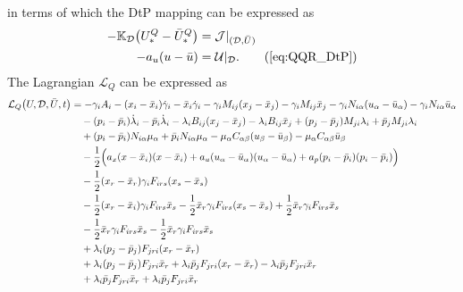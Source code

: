 \documentclass[11pt]{article}
\newcommand{\K}{\mathbb{K}}
\newcommand{\half}{\frac{1}{2}}
\newcommand{\calU}{{\cal U}}
\newcommand{\dee}{\mathcal{D}}
\newcommand{\scl}{\mathcal{L}}
\begin{document}
in terms of which the DtP mapping can be expressed as
\begin{subequations}\label{eq:QQR_DtP}
    \allowdisplaybreaks
    \begin{align}
        - \K_\dee \big(U^Q_* - \bar{U}^Q_*\big) & = \mathcal{J}|_{(\dee,\bar{U})} \notag\\
        - a_u (u - \bar{u}) & = \calU |_\dee. \tag{\ref{eq:QQR_DtP}}
    \end{align}
\end{subequations}
The Lagrangian $\scl_Q$ can be expressed as
\begin{subequations}\label{eq:mixed_QQR_L}
\allowdisplaybreaks
\begin{align}
    \scl_Q \big( U,\dee,\bar{U},t\big) & = - \gamma_i A_i -(x_i - \bar{x}_i) \dot{\gamma}_i - \bar{x}_i \dot{\gamma}_i - \gamma_i M_{ij} (x_j - \bar{x}_j) - \gamma_i M_{ij} \bar{x}_j - \gamma_i N_{i\alpha} (u_\alpha - \bar{u}_\alpha) - \gamma_i N_{i \alpha} \bar{u}_\alpha \notag\\
    & \quad - (p_i - \bar{p}_i) \dot{\lambda}_i - \bar{p}_i \dot{\lambda}_i - \lambda_i B_{ij} (x_j - \bar{x}_j) - \lambda_i B_{ij} \bar{x}_j + (p_j - \bar{p}_j) M_{ji} \lambda_i + \bar{p}_j M_{ji} \lambda_i \notag\\
    & \quad + (p_i - \bar{p}_i) N_{i \alpha} \mu_\alpha + \bar{p}_i N_{i \alpha} \mu_\alpha - \mu_\alpha C_{\alpha \beta} (u_\beta - \bar{u}_\beta) - \mu_\alpha 
    C_{\alpha \beta} \bar{u}_\beta \notag\\
    & \quad - \half \Big( a_x (x - \bar{x}_i) (x - \bar{x}_i) + a_u(u_\alpha - \bar{u}_\alpha) (u_\alpha - \bar{u}_\alpha) + a_p(p_i - \bar{p}_i)(p_i - \bar{p}_i) \Big) \notag\\
    & \quad - \half (x_r - \bar{x}_r) \gamma_i F_{irs} (x_s - \bar{x}_s) \notag\\
    & \quad - \half (x_r - \bar{x}_i) \gamma_iF_{irs} \bar{x}_s  - \half \bar{x}_r \gamma_i F_{irs} (x_s - \bar{x}_s) + \half \bar{x}_r \gamma_i F_{irs} \bar{x}_s \notag\\
    & \quad - \half \bar{x}_r \gamma_i F_{irs} \bar{x}_s - \half \bar{x}_r \gamma_i F_{irs} \bar{x}_s \notag\\
    & \quad + \lambda_i ( p_j - \bar{p}_j ) F_{jri} ( x_r - \bar{x}_r ) \notag \\
    & \quad + \lambda_i (p_j - \bar{p}_j ) F_{jri} \bar{x}_r + \lambda_i \bar{p}_j F_{jri} ( x_r - \bar{x}_r ) - \lambda_i \bar{p}_j F_{jri} \bar{x}_r \notag \\
    & \quad + \lambda_i \bar{p}_j F_{jri} \bar{x}_r + \lambda_i \bar{p}_j F_{jri} \bar{x}_r \notag \\

\end{align}
\end{subequations}
\end{document}
